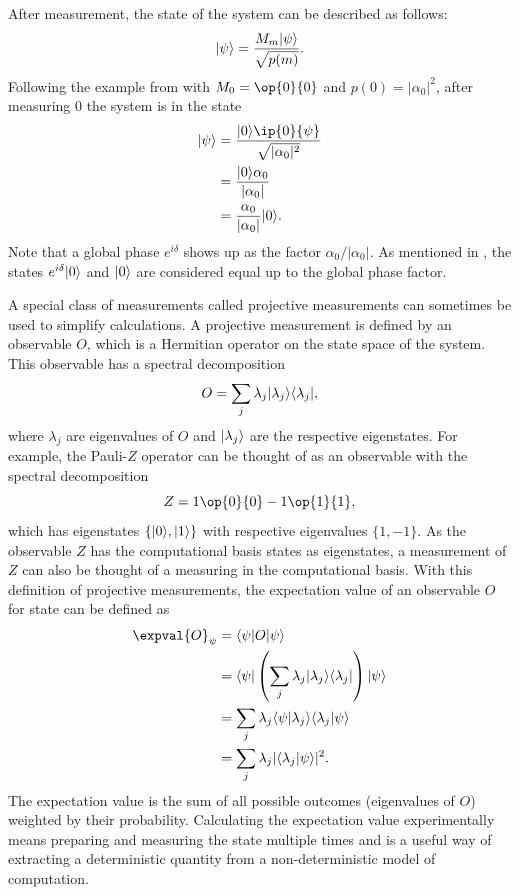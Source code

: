 After measurement, the state of the system can be described as follows:
\begin{equation}
\vert{\psi}\rangle = \dfrac{M_m\vert{\psi}\rangle}{\sqrt{p(m)}}.
\end{equation}
Following the example from  with $M_0 = \op{0}{0}$ and $p(0) = |\alpha_0|^2$, after measuring 0 the system is in the state
\begin{equation}
\begin{aligned}
\ket{\psi} &= \dfrac{\ket{0}\ip{0}{\psi}}{\sqrt{|\alpha_0|^2}} \\
&= \dfrac{\ket{0}\alpha_0}{|\alpha_0|} \\
&= \dfrac{\alpha_0}{|\alpha_0|} \ket{0}.
\end{aligned}
\end{equation}
Note that a global phase $e^{i\delta}$ shows up as the factor $\alpha_0/|\alpha_0|$.
As mentioned in , the states $e^{i\delta}\vert{0}\rangle$ and $\vert{0}\rangle$ are considered equal up to the global phase factor.

A special class of measurements called projective measurements can sometimes be used to simplify calculations.
A projective measurement is defined by an observable $O$, which is a Hermitian operator on the state space of the system.
This observable has a spectral decomposition
\begin{equation}
O = \sum_{j}\lambda_j \vert{\lambda_j}\rangle\langle{\lambda_j}\vert,
\end{equation}
where $\lambda_j$ are eigenvalues of $O$ and $\vert{\lambda_j}\rangle$ are the respective eigenstates.
For example, the Pauli-$Z$ operator can be thought of as an observable with the spectral decomposition
\begin{equation}
Z = 1\op{0}{0} - 1\op{1}{1},
\end{equation}
which has eigenstates $\{\vert{0}\rangle, \vert{1}\rangle\}$ with respective eigenvalues $\{1, -1\}$.
As the observable $Z$ has the computational basis states as eigenstates, a measurement of $Z$ can also be thought of a measuring in the computational basis.
With this definition of projective measurements, the expectation value of an observable $O$ for state \ket{\psi} can be defined as
\begin{equation}
\begin{aligned}
\expval{O}_\psi &= \bra{\psi}O\ket{\psi} \\
&= \bra{\psi}\left(\sum_{j}\lambda_j \vert\lambda_j\rangle \langle\lambda_j\vert \right)\ket{\psi} \\
&= \sum_{j}\lambda_j \langle \psi | \lambda_j\rangle \langle \lambda_j \vert \psi \rangle \\
&= \sum_{j}\lambda_j \vert\langle\lambda_j \vert \psi\rangle \rvert^2.
\end{aligned}
\end{equation}
The expectation value is the sum of all possible outcomes (eigenvalues of $O$) weighted by their probability.
Calculating the expectation value experimentally means preparing and measuring the state multiple times and is a useful way of extracting a deterministic quantity from a non-deterministic model of computation.

